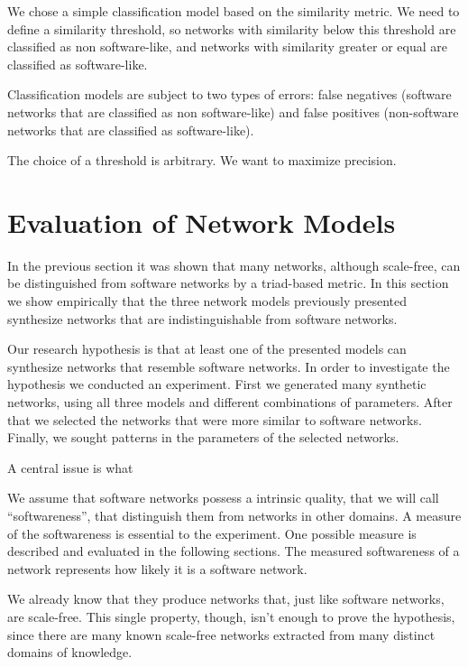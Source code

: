 We chose a simple classification model based on the similarity metric. We need
to define a similarity threshold, so networks with similarity below this
threshold are classified as non software-like, and networks with similarity
greater or equal are classified as software-like. 

Classification models are subject to two types of errors: false negatives
(software networks that are classified as non software-like) and false positives
(non-software networks that are classified as software-like). 

The choice of a threshold is arbitrary.
We want to maximize precision.

\section{Evaluation of Network Models}

In the previous section it was shown that many networks, although scale-free,
can be distinguished from software networks by a triad-based metric. In this
section we show empirically that the three network models previously presented
synthesize networks that are indistinguishable from software networks.



Our research hypothesis is that at least one of the presented models can
synthesize networks that resemble software networks. In order to investigate the
hypothesis we conducted an experiment. First we generated many synthetic
networks, using all three models and different combinations of parameters.
After that we selected the networks that were more similar to software networks.
Finally, we sought patterns in the parameters of the selected networks.

A central issue is what 

We assume that software networks possess a intrinsic quality, that we will call
``softwareness'', that distinguish them from networks in other domains. A
measure of the softwareness is essential to the experiment. One possible measure
is described and evaluated in the following sections. The measured softwareness
of a network represents how likely it is a software network.

We already know that they
produce networks that, just like software networks, are scale-free. This single
property, though, isn't enough to prove the hypothesis, since there are many
known scale-free networks extracted from many distinct domains of knowledge.

